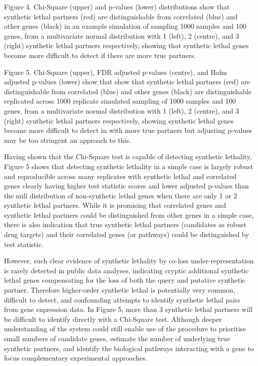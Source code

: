 Figure 4.  Chi-Square (upper) and p-values (lower) distributions show that synthetic lethal partners (red) are distinguishable from correlated (blue) and other genes (black) in an example simulation of sampling 1000 samples and 100 genes, from a multivariate normal distribution with 1 (left), 2 (centre), and 3 (right) synthetic lethal partners respectively, showing that synthetic lethal genes become more difficult to detect if there are more true partners.

Figure 5.  Chi-Square (upper), FDR adjusted p-values (centre), and Holm adjusted p-values (lower) show that show that synthetic lethal partners (red) are distinguishable from correlated (blue) and other genes (black) are distinguishable replicated across 1000 replicate simulated sampling of 1000 samples and 100 genes, from a multivariate normal distribution with 1 (left), 2 (centre), and 3 (right) synthetic lethal partners respectively, showing synthetic lethal genes become more difficult to detect in with more true partners but adjusting p-values may be too stringent an approach to this.

Having shown that the Chi-Square test is capable of detecting synthetic lethality, Figure 5 shows that detecting synthetic lethality in a simple case is largely robust and reproducible across many replicates with synthetic lethal and correlated genes clearly having higher test statistic scores and lower adjusted p-values than the null distribution of non-synthetic lethal genes when there are only 1 or 2 synthetic lethal partners.  While it is promising that correlated genes and synthetic lethal partners could be distinguished from other genes in a simple case, there is also indication that true synthetic lethal partners (candidates as robust drug targets) and their correlated genes (or pathways) could be distinguished by test statistic.

However, such clear evidence of synthetic lethality by co-loss under-representation is rarely detected in public data analyses, indicating cryptic additional synthetic lethal genes compensating for the loss of both the query and putative synthetic partner.  Therefore higher-order synthetic lethal is potentially very common, difficult to detect, and confounding attempts to identify synthetic lethal pairs from gene expression data.  In Figure 5, more than 3 synthetic lethal partners will be difficult to identify directly with a Chi-Square test.  Although deeper understanding of the system could still enable use of the procedure to prioritise small numbers of candidate genes, estimate the number of underlying true synthetic partners, and identify the biological pathways interacting with a gene to focus complementary experimental approaches.

